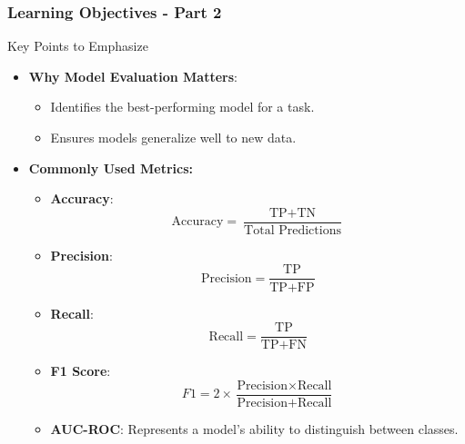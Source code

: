 \documentclass[aspectratio=169]{beamer}
\begin{document}
\begin{frame}[fragile]
    \frametitle{Learning Objectives - Part 2}
    
    \begin{block}{Key Points to Emphasize}
        \begin{itemize}
            \item \textbf{Why Model Evaluation Matters}:
                \begin{itemize}
                    \item Identifies the best-performing model for a task.
                    \item Ensures models generalize well to new data.
                \end{itemize}
            \item \textbf{Commonly Used Metrics:}
                \begin{itemize}
                    \item \textbf{Accuracy}:
                    \begin{equation}
                    \text{Accuracy} = \frac{\text{TP} + \text{TN}}{\text{Total Predictions}}
                    \end{equation}
                    \item \textbf{Precision}:
                    \begin{equation}
                    \text{Precision} = \frac{\text{TP}}{\text{TP} + \text{FP}}
                    \end{equation}
                    \item \textbf{Recall}:
                    \begin{equation}
                    \text{Recall} = \frac{\text{TP}}{\text{TP} + \text{FN}}
                    \end{equation}
                    \item \textbf{F1 Score}:
                    \begin{equation}
                    F1 = 2 \times \frac{\text{Precision} \times \text{Recall}}{\text{Precision} + \text{Recall}}
                    \end{equation}
                    \item \textbf{AUC-ROC}: Represents a model's ability to distinguish between classes.
                \end{itemize}
        \end{itemize}
    \end{block}
\end{frame}
\end{document}
